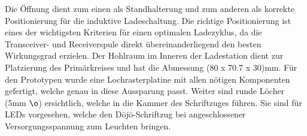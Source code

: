 Die Öffnung dient zum einen als Standhalterung und zum anderen als korrekte Positionierung für die induktive Ladeschaltung. Die richtige Positionierung ist eines der wichtigsten Kriterien für einen optimalen Ladezyklus, da die Transceiver- und Receiverspule direkt übereinanderliegend den besten Wirkungsgrad erzielen. Der Hohlraum im Inneren der Ladestation dient zur Platzierung des Primärkreises und hat die Abmessung (80 x 70.7 x 30)mm. Für den Prototypen wurde eine Lochrasterplatine mit allen nötigen Komponenten gefertigt, welche genau in diese Aussparung passt. Weiter sind runde Löcher (5mm $\o$) ersichtlich, welche in die Kammer des Schriftzuges führen. Sie sind für LEDs vorgesehen, welche den Dōjō-Schriftzug bei angeschlossener Versorgungsspannung zum Leuchten bringen.
